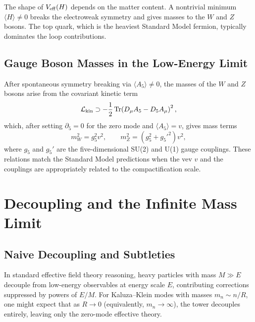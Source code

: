 \begin{remark}
The shape of \(V_{\rm eff}(H)\) depends on the matter content.  A nontrivial
minimum \(\langle H \rangle \neq 0\) breaks the electroweak symmetry and gives
masses to the \(W\) and \(Z\) bosons.  The top quark, which is the heaviest
Standard Model fermion, typically dominates the loop contributions.
\end{remark}

\subsection{Gauge Boson Masses in the Low-Energy Limit}

After spontaneous symmetry breaking via \(\langle A_5 \rangle \neq 0\), the masses
of the \(W\) and \(Z\) bosons arise from the covariant kinetic term
\begin{equation}
  \mathcal{L}_{\rm kin} \supset -\frac{1}{2} \operatorname{Tr}\!\left(D_\mu A_5 - D_5 A_\mu\right)^2,
  \label{eq:covariant-kinetic-term}
\end{equation}
which, after setting \(\partial_5 = 0\) for the zero mode and \(\langle A_5 \rangle = v\),
gives mass terms
\begin{equation}
  m_W^2 = g_5^2 v^2, \qquad m_Z^2 = (g_5^2 + g_5'^2) v^2,
  \label{eq:w-z-masses-five-d}
\end{equation}
where \(g_5\) and \(g_5'\) are the five-dimensional SU(2) and U(1) gauge couplings.
These relations match the Standard Model predictions when the vev \(v\) and the
couplings are appropriately related to the compactification scale.

\section{Decoupling and the Infinite Mass Limit}
\label{sec:kk-decoupling}

\subsection{Naive Decoupling and Subtleties}

In standard effective field theory reasoning, heavy particles with mass \(M \gg E\)
decouple from low-energy observables at energy scale \(E\), contributing corrections
suppressed by powers of \(E/M\).  For Kaluza--Klein modes with masses
\(m_n \sim n/R\), one might expect that as \(R \to 0\) (equivalently, \(m_n \to \infty\)),
the tower decouples entirely, leaving only the zero-mode effective theory.


